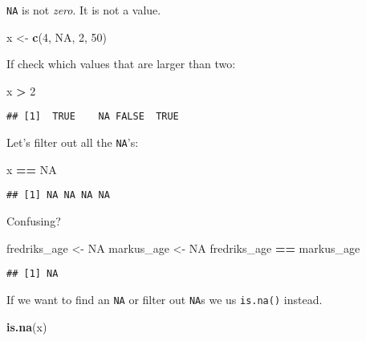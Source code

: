 \documentclass[]{book}
\newenvironment{Shaded}{\begin{snugshade}}{\end{snugshade}}
\newcommand{\DecValTok}[1]{\textcolor[rgb]{0.00,0.00,0.81}{#1}}
\newcommand{\KeywordTok}[1]{\textcolor[rgb]{0.13,0.29,0.53}{\textbf{#1}}}
\newcommand{\NormalTok}[1]{#1}
\newcommand{\OperatorTok}[1]{\textcolor[rgb]{0.81,0.36,0.00}{\textbf{#1}}}
\newcommand{\OtherTok}[1]{\textcolor[rgb]{0.56,0.35,0.01}{#1}}
\newcommand{\StringTok}[1]{\textcolor[rgb]{0.31,0.60,0.02}{#1}}
\begin{document}
\texttt{NA} is not \emph{zero}. It is not a value.

\begin{Shaded}
\begin{Highlighting}[]
\NormalTok{x <-}\StringTok{ }\KeywordTok{c}\NormalTok{(}\DecValTok{4}\NormalTok{, }\OtherTok{NA}\NormalTok{, }\DecValTok{2}\NormalTok{, }\DecValTok{50}\NormalTok{)}
\end{Highlighting}
\end{Shaded}

If check which values that are larger than two:

\begin{Shaded}
\begin{Highlighting}[]
\NormalTok{x }\OperatorTok{>}\StringTok{ }\DecValTok{2} 
\end{Highlighting}
\end{Shaded}

\begin{verbatim}
## [1]  TRUE    NA FALSE  TRUE
\end{verbatim}

Let's filter out all the \texttt{NA}'s:

\begin{Shaded}
\begin{Highlighting}[]
\NormalTok{x }\OperatorTok{==}\StringTok{ }\OtherTok{NA}
\end{Highlighting}
\end{Shaded}

\begin{verbatim}
## [1] NA NA NA NA
\end{verbatim}

Confusing?

\begin{Shaded}
\begin{Highlighting}[]
\NormalTok{fredriks_age <-}\StringTok{ }\OtherTok{NA}
\NormalTok{markus_age <-}\StringTok{ }\OtherTok{NA}
\NormalTok{fredriks_age }\OperatorTok{==}\StringTok{ }\NormalTok{markus_age}
\end{Highlighting}
\end{Shaded}

\begin{verbatim}
## [1] NA
\end{verbatim}

If we want to find an \texttt{NA} or filter out \texttt{NA}s we us \texttt{is.na()} instead.

\begin{Shaded}
\begin{Highlighting}[]
\KeywordTok{is.na}\NormalTok{(x)}
\end{Highlighting}
\end{Shaded}
\end{document}
